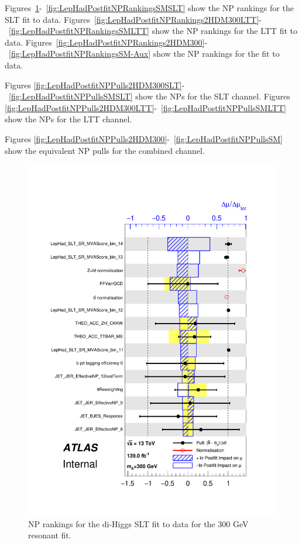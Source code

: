 Figures~\ref{fig:LepHadPostfitNPRankings2HDM300SLT}-~\ref{fig:LepHadPostfitNPRankingsSMSLT} show the NP rankings for the \lephad SLT fit to data.
Figures~\ref{fig:LepHadPostfitNPRankings2HDM300LTT}-~\ref{fig:LepHadPostfitNPRankingsSMLTT} show the NP rankings for the \lephad LTT fit to data.
Figures~\ref{fig:LepHadPostfitNPRankings2HDM300}-~\ref{fig:LepHadPostfitNPRankingsSM-Aux} show the NP rankings for the \lephad fit to data.

Figures \ref{fig:LepHadPostfitNPPulls2HDM300SLT}-~\ref{fig:LepHadPostfitNPPullsSMSLT} show the NPs for
the \lephad SLT channel.
Figures \ref{fig:LepHadPostfitNPPulls2HDM300LTT}-~\ref{fig:LepHadPostfitNPPullsSMLTT} show the NPs for
the \lephad LTT channel.



Figures \ref{fig:LepHadPostfitNPPulls2HDM300}-~\ref{fig:LepHadPostfitNPPullsSM} show the equivalent NP pulls for the combined \lephad channel.

\begin{figure}
   \centering
   \includegraphics[width=.8\textwidth]{figures/results/HH/LepHad/pulls_SigXsecOverSM_300_SLT.pdf}
   \caption{NP rankings for the di-Higgs \lephad SLT fit to data for the 300 GeV resonant fit.}
   \label{fig:LepHadPostfitNPRankings2HDM300SLT}
   \end{figure}
   
